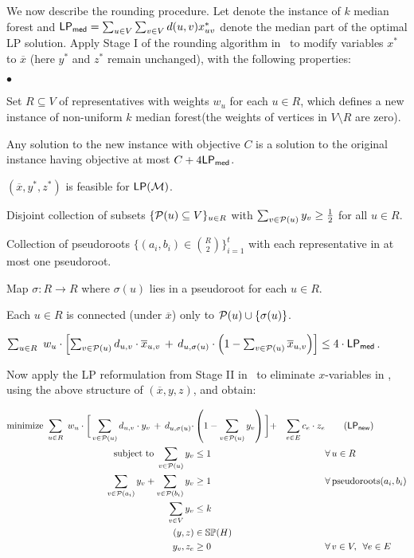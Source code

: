 \documentclass[11pt,twoside,a4paper]{article}
\newcommand{\initOneLiners}{\setlength{\itemsep}{0pt}
    \setlength{\parsep }{0pt}
    \setlength{\topsep }{0pt}
}
\newenvironment{OneLiners}[1][\ensuremath{\bullet}]
    {\begin{list}
        {#1}
        {\initOneLiners}}
    {\end{list}}
\newcommand{\sse}{\subseteq}
\def\kmf{$k$ median forest\xspace}
\begin{document}
We now describe the rounding procedure. Let \I denote the instance of \kmf and $\mathsf{LP_{med}} = \sum_{u \in V} \sum_{v \in V}
d(u,v) x^*_{uv}$ denote the median part of the optimal LP solution. Apply Stage I of the rounding algorithm
in~\cite{KKNSS11} to modify variables $x^*$ to $\overline{x}$ (here $y^*$ and $z^*$ remain unchanged), with the
following properties:
\begin{OneLiners}
 \item Set $R\sse V$ of representatives with weights $w_u$ for each $u\in R$, which defines a new instance \J of non-uniform \kmf (the weights of
 vertices in $V\setminus R$ are zero).
 \item Any solution to the new instance \J with objective $C$ is a solution to the original instance \I having
 objective at most $C+4\mathsf{LP_{med}}$.
 \item $(\overline{x},y^*,z^*)$ is feasible for $\mathsf{LP}({\mathcal{M}})$.
 \item Disjoint collection of subsets $\{\pri(u)\sse V\}_{u\in R}$ with $\sum_{v \in {\mathcal{P}}(u)} y_{v}\ge \frac12$ for all $u\in R$.
 \item Collection of pseudoroots $\{(a_i,b_i)\in {R\choose 2}\}_{i=1}^t$ with each representative in at
most one pseudoroot.
 \item Map $\sigma:R\rightarrow R$ where $\sigma(u)$ lies in a pseudoroot for each $u\in R$.
 \item Each $u\in R$ is connected (under $\overline{x}$) only to ${\mathcal{P}}(u)\cup \{\sigma(u)\}$.
 \item $\sum_{u\in R} \,\,w_u \cdot \left[ \sum_{v\in {\mathcal{P}}(u)} d_{u,v}\cdot \overline{x}_{u,v} \, + \, d_{u,\sigma(u)}\cdot
 \left(1- \sum_{v\in {\mathcal{P}}(u)} \overline{x}_{u,v} \right) \right] \le 4\cdot \mathsf{LP_{med}}$.
\end{OneLiners}

\medskip
Now apply the LP reformulation from Stage II in~\cite{KKNSS11} to eliminate $x$-variables in \LP, using the above
structure of $(\overline{x},y,z)$, and obtain: \begin{small}\begin{alignat}{2}
  \mbox{minimize } \sum_{u\in R} \,\,w_u \cdot \bigg[  \sum_{v\in \pri(u)} d_{u,v}\cdot y_v \,  + \, d_{u,\sigma(u)}\cdot
& \left(1- \sum_{v\in \pri(u)} y_v \right) \bigg]  + & \sum_{e\in E} c_e\cdot z_e  &  \tag{$\mathsf{LP_{new}}$} \\
  \mbox{subject to } \sum_{v \in \pri(u)} y_{v} &\le 1 & \qquad & \forall \,   u \in R   \label{nlp:1} \\
  \sum_{v \in \pri(a_i)} y_{v} + \sum_{v \in \pri(b_i)} y_{v} &\geq 1 & \qquad & \forall \, \mbox{pseudoroots} (a_i,b_i) \label{nlp:2} \\
  \sum_{v \in V} y_{v} &\leq k  & \qquad & \label{nlp:3}\\
  (y,z) &\in \spp(H)& \qquad & \label{nlp:4}\\
  y_{v}, z_e &\geq 0 & \qquad & \forall \, v \in V,\,\,\, \forall e\in E \label{nlp:5}
\end{alignat}\end{small}
\end{document}
